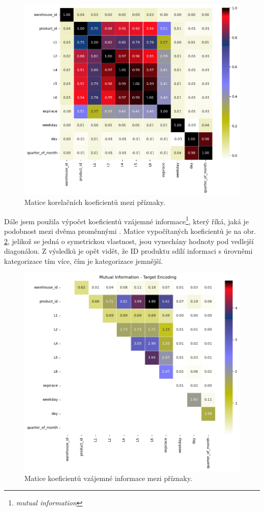 \begin{figure}[hbtp!]
    \centering
    \includegraphics[width=.8\textwidth]{obrazky/zntb/pearson.png}
    \caption{Matice korelačních koeficientů mezi příznaky.}
    \label{obr:nb:pearson}
\end{figure}

Dále jsem použila výpočet koeficientů vzájemné informace\footnote{\emph{mutual information}}, který říká, jaká je podobnost mezi dvěma proměnnými \cite{bib:scikit}. %
Matice vypočítaných koeficientů je na obr. \ref*{obr:nb:MI}, jelikož se jedná o symetrickou vlastnost, jsou vynechány hodnoty pod vedlejší diagonálou. Z výsledků je opět vidět, že ID produktu sdílí informaci s úrovněmi kategorizace tím více, čím je kategorizace jemnější.

\begin{figure}[hbtp!]
    \centering
    \includegraphics[width=.8\textwidth]{obrazky/zntb/MI_TE.png}
    \caption{Matice koeficientů vzájemné informace mezi příznaky.}
    \label{obr:nb:MI}
\end{figure}

